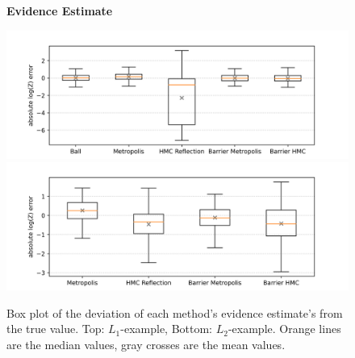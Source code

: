 \documentclass[12pt, a4paper]{report}
\begin{document}
\begin{figure}
    \centering
    {\small \textbf{Evidence Estimate} \par}
    \includegraphics[scale=0.7]{figs/results/logZ_diffs_spike_20d.png}
    \includegraphics[scale=0.7]{figs/results/logZ_diffs_spike_offcenter_20d.png}
    \caption{Box plot of the deviation of each method's evidence estimate's from the true value. Top: $L_1$-example, Bottom: $L_2$-example. Orange lines are the median values, gray crosses are the mean values.}
    \label{fig:results_logZ_diffs}
\end{figure}
\end{document}

